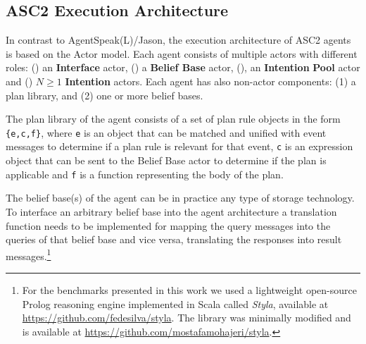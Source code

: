 \subsection{ASC2 Execution Architecture}
\label{section_arch}
In contrast to AgentSpeak(L)/Jason, the execution architecture of ASC2 agents is based on the Actor model. Each agent consists of multiple actors with different roles: () an \textbf{Interface} actor, () a \textbf{Belief Base} actor, (), an \textbf{Intention} \textbf{Pool} actor and () $N \ge 1$ \textbf{Intention} actors. Each agent has also non-actor components: (1) a plan library, and (2) one or more belief bases.

The plan library of the agent consists of a set of plan rule objects in the form \verb+{e,c,f}+, where \verb+e+ is an object that can be matched and unified with event messages to determine if a plan rule is relevant for that event, \verb+c+ is an expression object that can be sent to the Belief Base actor to determine if the plan is applicable and \verb+f+ is a function representing the body of the plan.

The belief base(s) of the agent can be in practice any type of storage technology. To interface an arbitrary belief base into the agent architecture a translation function needs to be implemented for mapping the query messages into the queries of that belief base and vice versa, translating the responses into result messages.\footnote{For the benchmarks presented in this work we used a lightweight open-source Prolog reasoning engine implemented in Scala called \textit{Styla}, available at \url{https://github.com/fedesilva/styla}. %
The library was minimally modified and is available at \url{https://github.com/mostafamohajeri/styla}.}

